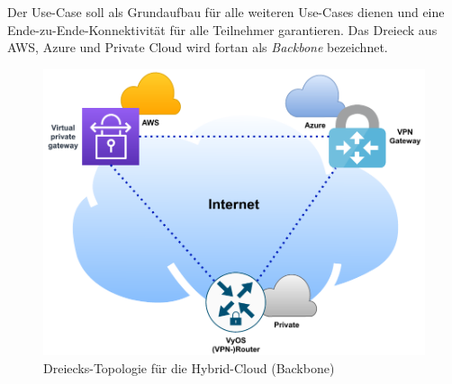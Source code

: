 
Der Use-Case soll als Grundaufbau für alle weiteren Use-Cases dienen und eine Ende-zu-Ende-Konnektivität für alle Teilnehmer garantieren. Das Dreieck aus AWS, Azure und Private Cloud wird fortan als \textit{Backbone} bezeichnet.

\begin{figure}[h]
  \centering
  \includegraphics{Figures/Use-Case-1_Basis_Deployment.pdf}
  \caption{Dreiecks-Topologie für die Hybrid-Cloud (\glqq Backbone\grqq{})}
  \label{grafik:Use-Case-1_Basis_Deployment}
\end{figure}\FloatBarrier

